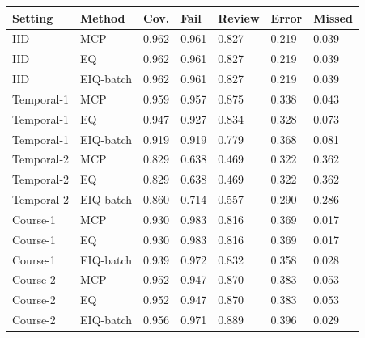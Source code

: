 \begin{tabular}{lllllll}
\toprule
Setting & Method & Cov. & Fail & Review & Error & Missed\\
\midrule
IID & MCP & 0.962 & 0.961 & 0.827 & 0.219 & 0.039\\
IID & EQ & 0.962 & 0.961 & 0.827 & 0.219 & 0.039\\
IID & EIQ-batch & 0.962 & 0.961 & 0.827 & 0.219 & 0.039\\
Temporal-1 & MCP & 0.959 & 0.957 & 0.875 & 0.338 & 0.043\\
Temporal-1 & EQ & 0.947 & 0.927 & 0.834 & 0.328 & 0.073\\
Temporal-1 & EIQ-batch & 0.919 & 0.919 & 0.779 & 0.368 & 0.081\\
Temporal-2 & MCP & 0.829 & 0.638 & 0.469 & 0.322 & 0.362\\
Temporal-2 & EQ & 0.829 & 0.638 & 0.469 & 0.322 & 0.362\\
Temporal-2 & EIQ-batch & 0.860 & 0.714 & 0.557 & 0.290 & 0.286\\
Course-1 & MCP & 0.930 & 0.983 & 0.816 & 0.369 & 0.017\\
Course-1 & EQ & 0.930 & 0.983 & 0.816 & 0.369 & 0.017\\
Course-1 & EIQ-batch & 0.939 & 0.972 & 0.832 & 0.358 & 0.028\\
Course-2 & MCP & 0.952 & 0.947 & 0.870 & 0.383 & 0.053\\
Course-2 & EQ & 0.952 & 0.947 & 0.870 & 0.383 & 0.053\\
Course-2 & EIQ-batch & 0.956 & 0.971 & 0.889 & 0.396 & 0.029\\
\bottomrule
\end{tabular}